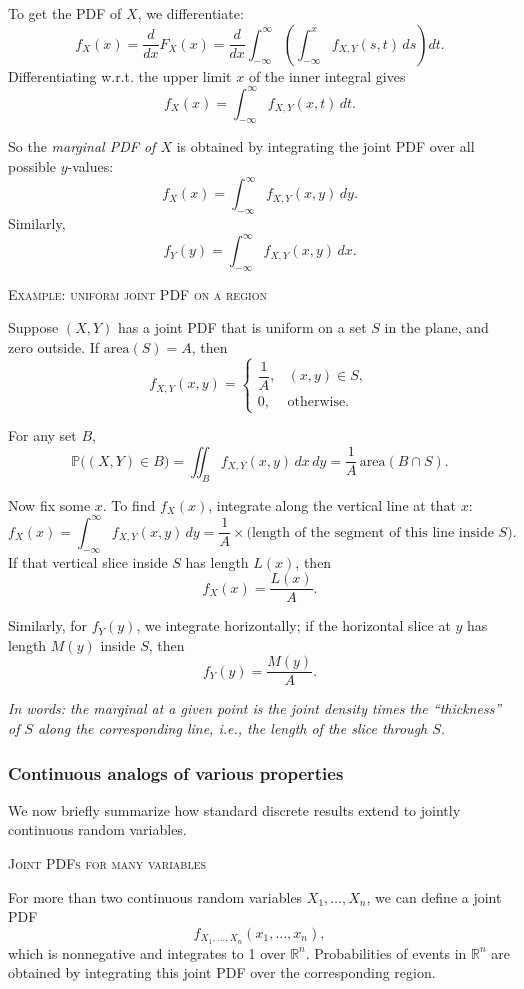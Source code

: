 To get the PDF of \(X\), we differentiate:
\[
f_X(x)
=
\frac{d}{dx}F_X(x)
=
\frac{d}{dx}
\int_{-\infty}^{\infty}
\left(
\int_{-\infty}^{x} f_{X,Y}(s,t)\,ds
\right)dt.
\]
Differentiating w.r.t. the upper limit \(x\) of the inner integral gives
\[
f_X(x)
=
\int_{-\infty}^{\infty} f_{X,Y}(x,t)\,dt.
\]

So the \textit{marginal PDF of \(X\)} is obtained by integrating the joint PDF over all possible \(y\)-values:
\[
f_X(x)
=
\int_{-\infty}^{\infty} f_{X,Y}(x,y)\,dy.
\]
Similarly,
\[
f_Y(y)
=
\int_{-\infty}^{\infty} f_{X,Y}(x,y)\,dx.
\]

\bigskip\textsc{Example: uniform joint PDF on a region}

Suppose \((X,Y)\) has a joint PDF that is uniform on a set \(S\) in the plane, and zero outside.  
If \(\text{area}(S)=A\), then
\[
f_{X,Y}(x,y)
=
\begin{cases}
\dfrac{1}{A}, & (x,y)\in S,\\[4pt]
0, & \text{otherwise}.
\end{cases}
\]

For any set \(B\),
\[
\mathbb{P}\big((X,Y)\in B\big)
=
\iint_{B} f_{X,Y}(x,y)\,dx\,dy
=
\frac{1}{A}\,\text{area}(B\cap S).
\]

Now fix some \(x\).  
To find \(f_X(x)\), integrate along the vertical line at that \(x\):
\[
f_X(x)
=
\int_{-\infty}^{\infty} f_{X,Y}(x,y)\,dy
=
\frac{1}{A}\times \big(\text{length of the segment of this line inside }S\big).
\]
If that vertical slice inside \(S\) has length \(L(x)\), then
\[
f_X(x) = \frac{L(x)}{A}.
\]

Similarly, for \(f_Y(y)\), we integrate horizontally; if the horizontal slice at \(y\) has length \(M(y)\) inside \(S\), then
\[
f_Y(y) = \frac{M(y)}{A}.
\]

\textit{In words: the marginal at a given point is the joint density times the “thickness” of \(S\) along the corresponding line, i.e., the length of the slice through \(S\).}


\subsubsection{Continuous analogs of various properties}

We now briefly summarize how standard discrete results extend to jointly continuous random variables.

\bigskip\textsc{Joint PDFs for many variables}

For more than two continuous random variables \(X_1,\dots,X_n\), we can define a joint PDF
\[
f_{X_1,\dots,X_n}(x_1,\dots,x_n),
\]
which is nonnegative and integrates to 1 over \(\mathbb{R}^n\).  
Probabilities of events in \(\mathbb{R}^n\) are obtained by integrating this joint PDF over the corresponding region.

